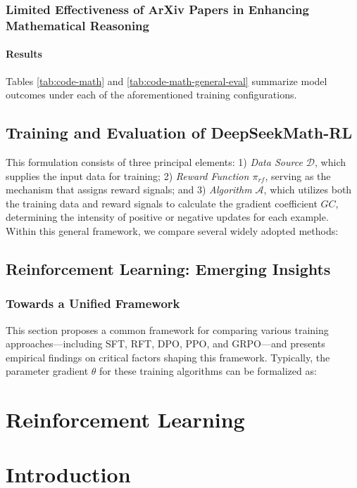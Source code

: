 \begin{itemize}[topsep=0pt]
\subsubsection{Limited Effectiveness of ArXiv Papers in Enhancing Mathematical Reasoning}

\paragraph{Results}
Tables \ref{tab:code-math} and \ref{tab:code-math-general-eval} summarize model outcomes under each of the aforementioned training configurations.

\subsection{Training and Evaluation of DeepSeekMath-RL}

This formulation consists of three principal elements: 1) \textit{Data Source $\mathcal{D}$}, which supplies the input data for training; 2) \textit{Reward Function $\pi_{{rf}}$}, serving as the mechanism that assigns reward signals; and 3) \textit{Algorithm $\mathcal{A}$}, which utilizes both the training data and reward signals to calculate the gradient coefficient $GC$, determining the intensity of positive or negative updates for each example. Within this general framework, we compare several widely adopted methods:

\subsection{Reinforcement Learning: Emerging Insights}
\subsubsection{Towards a Unified Framework} This section proposes a common framework for comparing various training approaches—including SFT, RFT, DPO, PPO, and GRPO—and presents empirical findings on critical factors shaping this framework. Typically, the parameter gradient $\theta$ for these training algorithms can be formalized as:

\section{Reinforcement Learning}

\section{Introduction}


\end{itemize}
